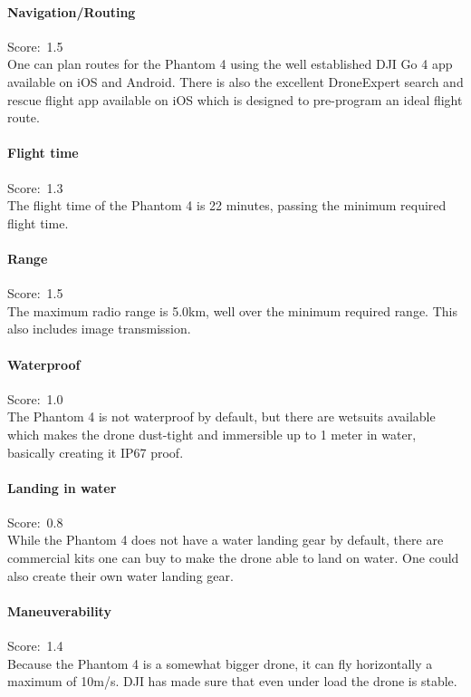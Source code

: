 \paragraph{Navigation/Routing}\mbox{Score: 1.5} \\
One can plan routes for the Phantom 4 using the well established DJI Go 4 app \cite{djigo} available on iOS and Android. There is also the excellent DroneExpert search and rescue flight app available on iOS which is designed to pre-program an ideal flight route. \cite{desar}

\paragraph{Flight time}\mbox{Score: 1.3} \\
The flight time of the Phantom 4 is 22 minutes, passing the minimum required flight time.

\paragraph{Range}\mbox{Score: 1.5} \\
The maximum radio range is 5.0km, well over the minimum required range. This also includes image transmission.

\paragraph{Waterproof}\mbox{Score: 1.0} \\
The Phantom 4 is not waterproof by default, but there are wetsuits available which makes the drone dust-tight and immersible up to 1 meter in water, basically creating it IP67 proof. \cite{phantomrain}

\paragraph{Landing in water}\mbox{Score: 0.8} \\
While the Phantom 4 does not have a water landing gear by default, there are commercial kits one can buy to make the drone able to land on water. \cite{buylanding} One could also create their own water landing gear. \cite{diylanding}

\paragraph{Maneuverability}\mbox{Score: 1.4} \\
Because the Phantom 4 is a somewhat bigger drone, it can fly horizontally a maximum of 10m/s. DJI has made sure that even under load the drone is stable.

